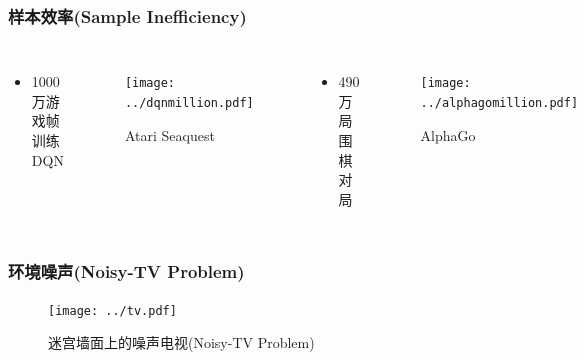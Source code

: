 \documentclass{beamer}
\begin{document}
\begin{CJK*}{GBK}{hei}
\begin{frame}\frametitle{样本效率(Sample Inefficiency)}
\begin{columns}
    \begin{itemize}
        \item 1000万游戏帧训练DQN
    \end{itemize}
    \begin{figure}[htbp]
        \centering\texttt{[image: ../dqnmillion.pdf]}
	\caption{Atari Seaquest\citep{Mnih2015HumanlevelCT}}
    \end{figure}
    \begin{itemize}
        \item 490万局围棋对局
    \end{itemize}
    \begin{figure}[htbp]
        \centering\texttt{[image: ../alphagomillion.pdf]}
	\caption{AlphaGo\citep{Silver2017MasteringTG}}
    \end{figure}
\end{columns}
\end{frame}

\begin{frame}\frametitle{环境噪声(Noisy-TV Problem)}
    \begin{figure}[htbp]
        \centering\texttt{[image: ../tv.pdf]}
	\caption{迷宫墙面上的噪声电视(Noisy-TV Problem)\citep{Burda2019ExplorationBR}}
    \end{figure}
\end{frame}


\end{CJK*}
\end{document}
